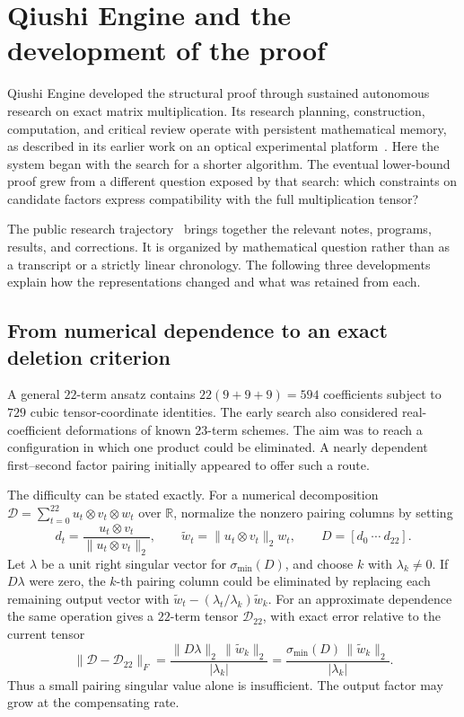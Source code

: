 \section{Qiushi Engine and the development of the proof}\label{sec:development}

Qiushi Engine developed the structural proof through sustained
autonomous research on exact matrix multiplication. Its research
planning, construction, computation, and critical review operate with
persistent mathematical memory, as described in its earlier work on
an optical experimental platform~\cite{qiushi-optics}. Here the system
began with the search for a shorter algorithm. The eventual lower-bound
proof grew from a different question exposed by that search: which
constraints on candidate factors express compatibility with the full
multiplication tensor?

The public research trajectory~\cite{qiushi-report} brings together
the relevant notes, programs, results, and corrections. It is organized
by mathematical question rather than as a transcript or a strictly
linear chronology. The following three developments explain how the
representations changed and what was retained from each.

\subsection{From numerical dependence to an exact deletion criterion}
A general $22$-term ansatz contains $22(9+9+9)=594$ coefficients
subject to $729$ cubic tensor-coordinate identities. The early search
also considered real-coefficient deformations of known $23$-term
schemes. The aim was to reach a configuration in which one product
could be eliminated. A nearly dependent first--second factor pairing
initially appeared to offer such a route.

The difficulty can be stated exactly. For a numerical decomposition
$\mathcal D=\sum_{t=0}^{22}u_t\otimes v_t\otimes w_t$ over
$\mathbb R$, normalize the nonzero pairing columns by setting
\[
 d_t=\frac{u_t\otimes v_t}{\|u_t\otimes v_t\|_2},\qquad
 \widetilde w_t=\|u_t\otimes v_t\|_2 w_t,\qquad
 D=[d_0\ \cdots\ d_{22}].
\]
Let $\lambda$ be a unit right singular vector for
$\sigma_{\min}(D)$, and choose $k$ with $\lambda_k\ne0$.
If $D\lambda$ were zero, the $k$-th pairing column could be
eliminated by replacing each remaining output vector with
$\widetilde w_t-(\lambda_t/\lambda_k)\widetilde w_k$.
For an approximate dependence the same operation gives a $22$-term
tensor $\mathcal D_{22}$, with exact error relative to the current
tensor
\begin{equation}\label{eq:deletion-diagnostic}
 \|\mathcal D-\mathcal D_{22}\|_F
   =\frac{\|D\lambda\|_2\,\|\widetilde w_k\|_2}{|\lambda_k|}
   =\frac{\sigma_{\min}(D)\,\|\widetilde w_k\|_2}{|\lambda_k|}.
\end{equation}
Thus a small pairing singular value alone is insufficient. The output
factor may grow at the compensating rate.

